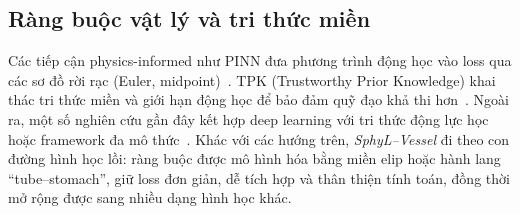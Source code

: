 \documentclass{IEEEtran}
\begin{document}
\subsection{Ràng buộc vật lý và tri thức miền}
Các tiếp cận physics-informed như PINN đưa phương trình động học vào loss qua các sơ đồ rời rạc (Euler, midpoint)~\cite{raissi2019pinn}. 
TPK (Trustworthy Prior Knowledge) khai thác tri thức miền và giới hạn động học để bảo đảm quỹ đạo khả thi hơn~\cite{zhang2023tpk}. 
Ngoài ra, một số nghiên cứu gần đây kết hợp deep learning với tri thức động lực học hoặc framework đa mô thức~\cite{zaman2024plos,li2024maker}. 
Khác với các hướng trên, \emph{SphyL--Vessel} đi theo con đường hình học lồi: 
ràng buộc được mô hình hóa bằng miền elip hoặc hành lang “tube--stomach”, 
giữ loss đơn giản, dễ tích hợp và thân thiện tính toán, đồng thời mở rộng được sang nhiều dạng hình học khác.
\end{document}
